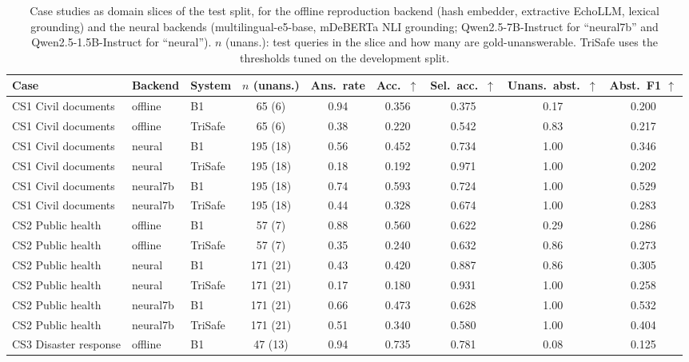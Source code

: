 \begin{table}[t]
  \caption{Case studies as domain slices of the test split, for the offline reproduction backend (hash embedder, extractive EchoLLM, lexical grounding) and the neural backends (multilingual-e5-base, mDeBERTa NLI grounding; Qwen2.5-7B-Instruct for ``neural7b'' and Qwen2.5-1.5B-Instruct for ``neural''). $n$ (unans.): test queries in the slice and how many are gold-unanswerable. TriSafe uses the thresholds tuned on the development split.}
  \label{tab:cases}
  \footnotesize
  \setlength{\tabcolsep}{4pt}
  \begin{tabular}{lllcccccc}
    \toprule
    Case & Backend & System & $n$ (unans.) & Ans.\ rate & Acc.\ $\uparrow$ & Sel.\ acc.\ $\uparrow$ & Unans.\ abst.\ $\uparrow$ & Abst.\ F1 $\uparrow$ \\
    \midrule
    CS1 Civil documents & offline & B1 & 65 (6) & 0.94 & 0.356 & 0.375 & 0.17 & 0.200 \\
    CS1 Civil documents & offline & TriSafe & 65 (6) & 0.38 & 0.220 & 0.542 & 0.83 & 0.217 \\
    CS1 Civil documents & neural & B1 & 195 (18) & 0.56 & 0.452 & 0.734 & 1.00 & 0.346 \\
    CS1 Civil documents & neural & TriSafe & 195 (18) & 0.18 & 0.192 & 0.971 & 1.00 & 0.202 \\
    CS1 Civil documents & neural7b & B1 & 195 (18) & 0.74 & 0.593 & 0.724 & 1.00 & 0.529 \\
    CS1 Civil documents & neural7b & TriSafe & 195 (18) & 0.44 & 0.328 & 0.674 & 1.00 & 0.283 \\
    \addlinespace
    CS2 Public health & offline & B1 & 57 (7) & 0.88 & 0.560 & 0.622 & 0.29 & 0.286 \\
    CS2 Public health & offline & TriSafe & 57 (7) & 0.35 & 0.240 & 0.632 & 0.86 & 0.273 \\
    CS2 Public health & neural & B1 & 171 (21) & 0.43 & 0.420 & 0.887 & 0.86 & 0.305 \\
    CS2 Public health & neural & TriSafe & 171 (21) & 0.17 & 0.180 & 0.931 & 1.00 & 0.258 \\
    CS2 Public health & neural7b & B1 & 171 (21) & 0.66 & 0.473 & 0.628 & 1.00 & 0.532 \\
    CS2 Public health & neural7b & TriSafe & 171 (21) & 0.51 & 0.340 & 0.580 & 1.00 & 0.404 \\
    \addlinespace
    CS3 Disaster response & offline & B1 & 47 (13) & 0.94 & 0.735 & 0.781 & 0.08 & 0.125 \\

\end{tabular}
\end{table}
